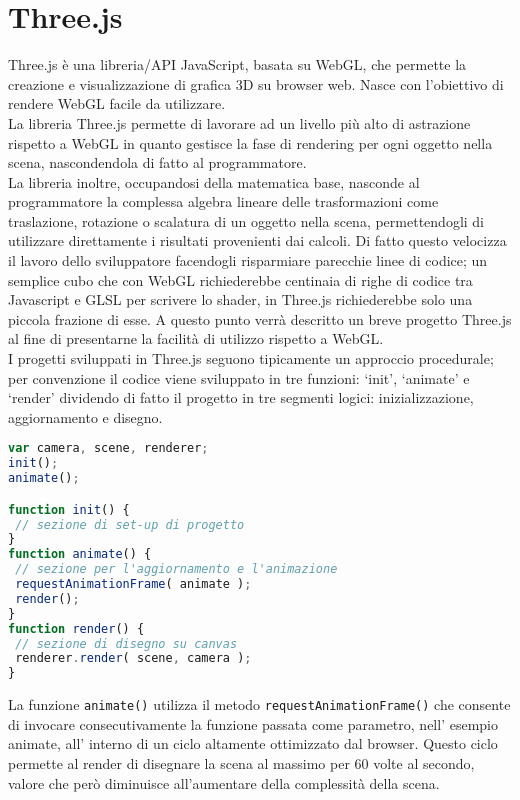 \section{Three.js}
\label{sec:chapter_tecnologie_abilitanti_threejs}

Three.js è una libreria/API JavaScript, basata su WebGL, che permette la creazione e visualizzazione di grafica 3D su browser web. Nasce con l’obiettivo di rendere WebGL facile da utilizzare.
\\
La libreria Three.js permette di lavorare ad un livello più alto di astrazione rispetto a WebGL in quanto gestisce la fase di rendering per ogni oggetto nella scena, nascondendola di fatto al programmatore.
\\
La libreria inoltre, occupandosi della matematica base, nasconde al programmatore la complessa algebra lineare delle trasformazioni come traslazione, rotazione o scalatura di un oggetto nella scena, permettendogli di utilizzare direttamente i risultati provenienti dai calcoli.
Di fatto questo velocizza il lavoro dello sviluppatore facendogli risparmiare parecchie linee di codice; un semplice cubo che con WebGL richiederebbe centinaia di righe di codice tra Javascript e GLSL per scrivere lo shader, in Three.js richiederebbe solo una piccola frazione di esse.
A questo punto verrà descritto un breve progetto Three.js al fine di presentarne la facilità di utilizzo rispetto a WebGL.
\\
I progetti sviluppati in Three.js seguono tipicamente un approccio procedurale; per convenzione il codice viene sviluppato in tre funzioni: ‘init’, ‘animate’ e ‘render’ dividendo di fatto il progetto in tre segmenti logici: inizializzazione, aggiornamento e disegno.
\begin{lstlisting}[language=javascript]
var camera, scene, renderer;
init();
animate();

function init() {
 // sezione di set-up di progetto
}
function animate() {
 // sezione per l'aggiornamento e l'animazione
 requestAnimationFrame( animate );
 render();
}
function render() {
 // sezione di disegno su canvas
 renderer.render( scene, camera );
}
\end{lstlisting}
La funzione \texttt{animate()} utilizza il metodo \texttt{requestAnimationFrame()} che consente di invocare consecutivamente la funzione passata come parametro, nell’ esempio animate, all’ interno di un ciclo altamente ottimizzato dal browser. Questo ciclo permette al render di disegnare la scena al massimo per 60 volte al secondo, valore che però diminuisce all’aumentare della complessità della scena.
